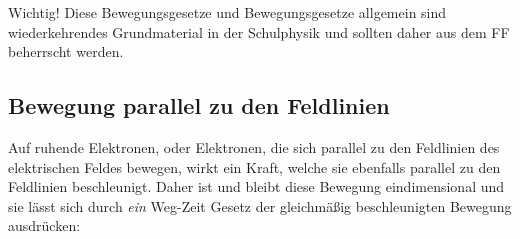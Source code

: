 




%
%	






\begin{leftbar}
Wichtig! Diese Bewegungsgesetze und Bewegungsgesetze allgemein sind wiederkehrendes Grundmaterial in der Schulphysik und sollten daher \glqq aus dem FF\grqq{} beherrscht werden.
\end{leftbar}

\subsection{Bewegung parallel zu den Feldlinien} \label{subsec:BewegungsgesetzParallel}

Auf ruhende Elektronen, oder Elektronen, die sich parallel zu den Feldlinien des elektrischen Feldes bewegen, wirkt ein Kraft, welche sie ebenfalls parallel zu den Feldlinien beschleunigt. Daher ist und bleibt diese Bewegung eindimensional und sie lässt sich durch \emph{ein} Weg-Zeit Gesetz der gleichmäßig beschleunigten Bewegung ausdrücken:

